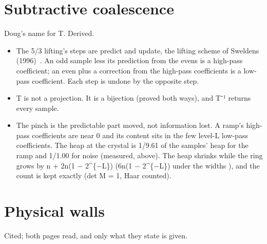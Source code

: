 \section{\texorpdfstring{Subtractive coalescence}{Subtractive coalescence}}

Doug's name for T. Derived.

\begin{itemize}
\item The 5/3 lifting's steps are predict and update, the lifting scheme of Sweldens (1996)~\cite{src:Sweldens-1996}. An odd sample less its prediction from the evens is a high-pass coefficient; an even plus a correction from the high-pass coefficients is a low-pass coefficient. Each step is undone by the opposite step.
\item T is not a projection. It is a bijection (proved both ways), and T⁻¹ returns every sample.
\item The pinch is the predictable part moved, not information lost. A ramp's high-pass coefficients are near 0 and its content sits in the few level-L low-pass coefficients. The heap at the crystal is 1/9.61 of the samples' heap for the ramp and 1/1.00 for noise (measured, above). The heap shrinks while the ring grows by n + 2n(1 − 2\textasciicircum{}\{−L\}) (6n(1 − 2\textasciicircum{}\{−L\}) under the widths ), and the count is kept exactly (det M = 1, Haar counted).
\end{itemize}

\section{\texorpdfstring{Physical walls}{Physical walls}}

Cited; both pages read, and only what they state is given.

